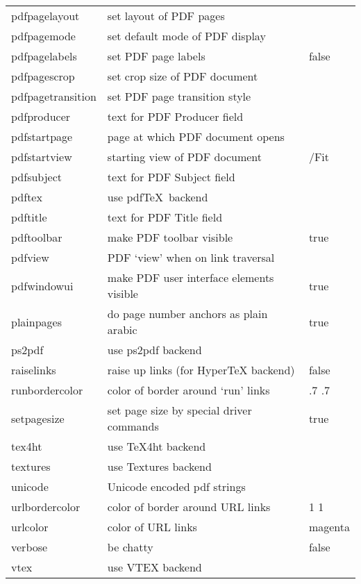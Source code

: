 \documentclass{article}
\newcommand{\optempty}{{\rmfamily\textit{empty}}}
\begin{document}
\begin{longtable}{>{\ttfamily}lp{5cm}>{\ttfamily}l}
pdfpagelayout &set layout of PDF pages&\optempty\\
pdfpagemode &set default mode of PDF display&\optempty\\
pdfpagelabels &set PDF page labels&false\\
pdfpagescrop &set crop size of PDF document&\optempty\\
pdfpagetransition &set PDF page transition style&\optempty\\
pdfproducer &text for PDF Producer field&\optempty\\
pdfstartpage &page at which PDF document opens&1\\
pdfstartview &starting view of PDF document& /Fit\\
pdfsubject &text for PDF Subject field&\optempty\\
pdftex &use pdf\TeX\ backend\\
pdftitle &text for PDF Title field&\optempty\\
pdftoolbar &make PDF toolbar visible&true\\
pdfview &PDF `view' when on link traversal&\optempty\\
pdfwindowui &make PDF user interface  elements visible&true\\
plainpages &do page number anchors as plain arabic&true\\
ps2pdf &use ps2pdf backend\\
raiselinks &raise up links (for HyperTeX backend)&false\\
runbordercolor &color of border around `run' links& 0 .7 .7\\
setpagesize &set page size by special driver commands&true\\
tex4ht &use \TeX4ht backend\\
textures &use Textures backend\\
unicode &Unicode encoded pdf strings\\
urlbordercolor &color of border around URL links& 0 1 1\\
urlcolor &color of URL links&magenta\\
verbose &be chatty&false\\
vtex &use VTEX backend\\
\hline
\end{longtable}
\end{document}
